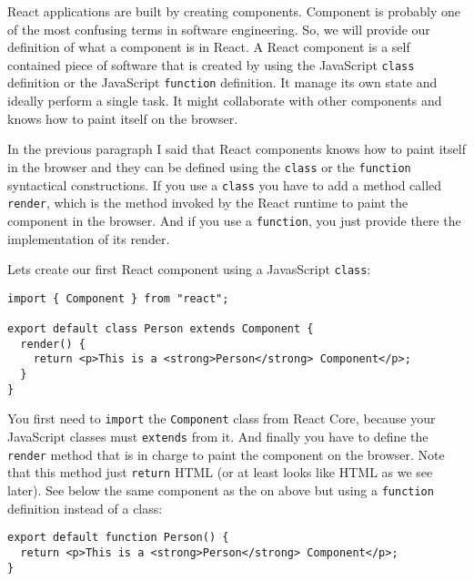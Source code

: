 \documentclass[a4paper, oneside, titlepage, 12pt]{book}
\begin{document}
React applications are built by creating components. Component is probably one of the most confusing terms in software engineering. So, we will provide our definition of what a component is in React. A React component is a self contained piece of software that is created by using the JavaScript \texttt{class} definition or the JavaScript \texttt{function} definition. It manage its own state and ideally perform a single task. It might collaborate with other components and knows how to paint itself on the browser.

In the previous paragraph I said that React components knows how to paint itself in the browser and they can be defined using the \texttt{class} or the \texttt{function} syntactical constructions. If you use a \texttt{class} you have to add a method called \texttt{render}, which is the method invoked by the React runtime to paint the component in the browser. And if you use a \texttt{function}, you just provide there the implementation of its render.

Lets create our first React component using a JavasScript \texttt{class}:

\begin{verbatim}
import { Component } from "react";

export default class Person extends Component {
  render() {
    return <p>This is a <strong>Person</strong> Component</p>;
  }
}
\end{verbatim}

You first need to \texttt{import} the \texttt{Component} class from React Core, because your JavaScript classes must \texttt{extends} from it. And finally you have to define the \texttt{render} method that is in charge to paint the component on the browser. Note that this method just \texttt{return} HTML (or at least looks like HTML as we see later). See below the same component as the on above but using a \texttt{function} definition instead of a class:

\begin{verbatim}
export default function Person() {
  return <p>This is a <strong>Person</strong> Component</p>;
}
\end{verbatim}
\end{document}
